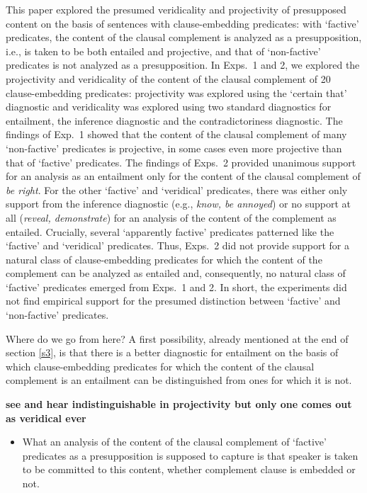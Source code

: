 \documentclass[11pt,fleqn]{article}
\newcommand{\6}{\mbox{$[\hspace*{-.6mm}[$}}
\newcommand{\9}{\mbox{$]\hspace*{-.6mm}]$}}
\begin{document}
{This paper explored the presumed veridicality and projectivity of presupposed content on the basis of sentences with clause-embedding predicates: with `factive' predicates, the content of the clausal complement is analyzed as a presupposition, i.e., is taken to be both entailed and projective, and that of `non-factive' predicates is not analyzed as a presupposition. In Exps.~1 and 2, we explored the projectivity and veridicality of the content of the clausal complement of 20 clause-embedding predicates: projectivity was explored using the `certain that' diagnostic and veridicality was explored using two standard diagnostics for entailment, the inference diagnostic and the contradictoriness diagnostic. The findings of Exp.~1 showed that the content of the clausal complement of many `non-factive' predicates is projective, in some cases even more projective than that of `factive' predicates. The findings of Exps.~2  provided unanimous support for an analysis as an entailment only for the content of the clausal complement of {\em be right}. For the other `factive' and `veridical' predicates, there was either only support from the inference diagnostic (e.g., {\em know, be annoyed}) or no support at all ({\em reveal, demonstrate}) for an analysis of the content of the complement as entailed. Crucially, several `apparently factive' predicates patterned like the `factive' and `veridical' predicates. Thus, Exps.~2 did not provide support for a natural class of clause-embedding predicates for which the content of the complement can be analyzed as entailed and, consequently, no natural class of `factive' predicates emerged from Exps.~1 and 2. In short, the experiments did not find empirical support for the presumed distinction between `factive' and `non-factive' predicates.

Where do we go from here? A first possibility, already mentioned at the end of section \ref{s3}, is that there is a better diagnostic for entailment on the basis of which clause-embedding predicates for which the content of the clausal complement is an entailment can be distinguished from ones for which it is not. 


{\bf see and hear indistinguishable in projectivity but only one comes out as veridical ever}



\begin{itemize}

\item What an analysis of the content of the clausal complement of `factive' predicates as a presupposition is supposed to capture is that speaker is taken to be committed to this content, whether complement clause is embedded or not. 


\end{itemize}}
\end{document}
